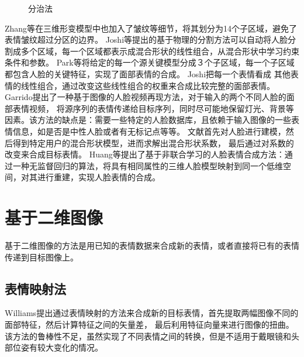 \documentclass{ctexart}
\begin{document}
\begin{figure}[htbp]
{\begin{minipage}[t]{0.3\linewidth}
		\end{minipage}%
	}
	\caption{分治法}
\end{figure}
Zhang等\cite{7}在三维形变模型中也加入了皱纹等细节，将其划分为14个子区域，避免了表情皱纹超过分区的边界。
Joshi等\cite{8}提出的基于物理的分割方法可以自动将人脸分割成多个区域，每一个区域都表示成混合形状的线性组合，从混合形状中学习约束条件和参数。
Park等\cite{9}将给定的每一个源关键模型分成３个子区域，每一个子区域都包含人脸的关键特征，实现了面部表情的合成。
Joshi\cite{10}把每一个表情看成 其他表情的线性组合，通过改变这些线性组合的权重来合成比较完整的面部表情。
Garrido\cite{11}提出了一种基于图像的人脸视频再现方法，对于输入的两个不同人脸的面部表情视频， 将源序列的表情传递给目标序列，同时尽可能地保留灯光、背景等因素。该方法的缺点是：需要一些特定的人脸数据库，且依赖于输入图像的一些表情信息，如是否是中性人脸或者有无标记点等等。
文献\cite{12,13}首先对人脸进行建模，然后得到特定用户的混合形状模型，进而求解出混合形状系数， 最后通过对系数的改变来合成目标表情。
Huang等\cite{14}提出了基于非联合学习的人脸表情合成方法：通过一种无监督回归的算法，将具有相同属性的三维人脸模型映射到同一个低维空间，对其进行重建，实现人脸表情的合成。
\section{\hei 基于二维图像}
基于二维图像的方法是用已知的表情数据来合成新的表情，或者直接将已有的表情传递到目标图像上。
\subsection{\hei 表情映射法}
Williams\cite{15}提出通过表情映射的方法来合成新的目标表情，首先提取两幅图像不同的面部特征，然后计算特征之间的矢量差， 最后利用特征向量来进行图像的扭曲。该方法的鲁棒性不足，虽然实现了不同表情之间的转换，但是不适用于戴眼镜和头部位姿有较大变化的情况。
\end{document}

